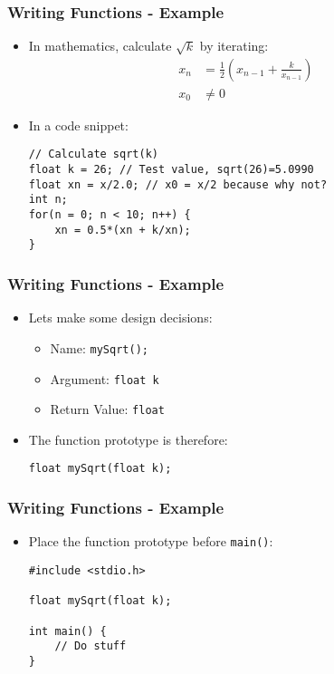 \documentclass[14pt]{beamer}
\begin{document}
\begin{frame}[fragile]
\frametitle{Writing Functions - Example}
\begin{itemize}
\item In mathematics, calculate $\sqrt{k}$ by iterating:
\begin{align*}
x_n &= \frac{1}{2}\left(x_{n-1} + \frac{k}{x_{n-1}}\right)\\
x_0 &\neq 0
\end{align*}
\item In a code snippet:
\begin{lstlisting}[style=CStyle]
// Calculate sqrt(k)
float k = 26; // Test value, sqrt(26)=5.0990
float xn = x/2.0; // x0 = x/2 because why not?
int n;
for(n = 0; n < 10; n++) {
	xn = 0.5*(xn + k/xn);
}
\end{lstlisting}
\end{itemize}
\end{frame}

\begin{frame}[fragile]
\frametitle{Writing Functions - Example}
\begin{itemize}
\item Lets make some design decisions:
	\begin{itemize}
		\item Name: \texttt{mySqrt();}
		\item Argument: \texttt{float k}
		\item Return Value: \texttt{float}
	\end{itemize}
\item The function prototype is therefore:
\begin{lstlisting}[style=CStyle]
float mySqrt(float k);
\end{lstlisting}
\end{itemize}
\end{frame}

\begin{frame}[fragile]
\frametitle{Writing Functions - Example}
\begin{itemize}
\item Place the function prototype before \texttt{main()}:
\begin{lstlisting}[style=CStyle]
#include <stdio.h>

float mySqrt(float k);

int main() {
	// Do stuff
}
\end{lstlisting}
\end{itemize}
\end{frame}
\end{document}

